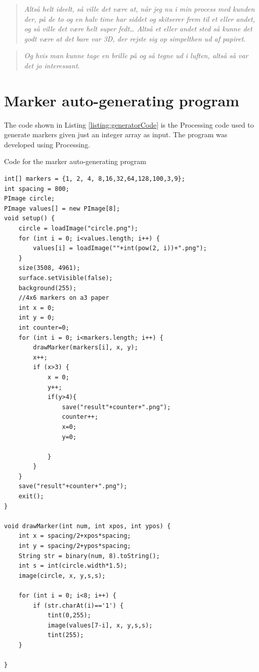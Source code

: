 \begin{quote}
	\textit{Altså helt ideelt, så ville det være at, når jeg nu i min process med kunden der, på de to og en halv time har siddet og skitserer frem til et eller andet, og så ville det være helt super fedt… Altså et eller andet sted så kunne det godt være at det bare var 3D, der rejste sig op simpelthen ud af papiret}\label{quote:expertIdeas3Danish}.\\
\end{quote}

\begin{quote}
	\textit{Og hvis man kunne tage en brille på og så tegne ud i luften, altså så var det jo interessant}\label{quote:expertIdeas4Danish}.\\
\end{quote}



\section{Marker auto-generating program}
The code shown in Listing \ref{listing:generatorCode} is the Processing code used to generate markers given just an integer array as input. The program was developed using Processing.

\begin{listing}[H]
	\caption{Code for the marker auto-generating program}
	\label{listing:generatorCode}
	\begin{verbatim}
int[] markers = {1, 2, 4, 8,16,32,64,128,100,3,9};
int spacing = 800;
PImage circle;
PImage values[] = new PImage[8];
void setup() {
	circle = loadImage("circle.png");
	for (int i = 0; i<values.length; i++) {
		values[i] = loadImage(""+int(pow(2, i))+".png");
	}
	size(3508, 4961);
	surface.setVisible(false);
	background(255);
	//4x6 markers on a3 paper
	int x = 0;
	int y = 0;
	int counter=0;
	for (int i = 0; i<markers.length; i++) {
		drawMarker(markers[i], x, y);
		x++;
		if (x>3) {
			x = 0;
			y++;
			if(y>4){
				save("result"+counter+".png");
				counter++;
				x=0;
				y=0;
				
			}
		}
	}
	save("result"+counter+".png");
	exit();
}

void drawMarker(int num, int xpos, int ypos) {
	int x = spacing/2+xpos*spacing;
	int y = spacing/2+ypos*spacing;
	String str = binary(num, 8).toString();
	int s = int(circle.width*1.5);
	image(circle, x, y,s,s);
	
	for (int i = 0; i<8; i++) {
		if (str.charAt(i)=='1') {
			tint(0,255);
			image(values[7-i], x, y,s,s);
			tint(255); 
	}
	
}
	\end{verbatim}
\end{listing}

